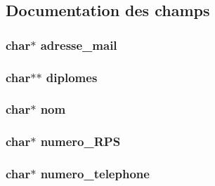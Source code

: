 \subsection{Documentation des champs}
\hypertarget{struct_medecin_aefa944e4b78fb9e14c4f6e49605bba2c}{
\subsubsection[{adresse\-\_\-mail}]{\setlength{\rightskip}{0pt plus 5cm}char$\ast$ adresse\-\_\-mail}}\label{struct_medecin_aefa944e4b78fb9e14c4f6e49605bba2c}
\hypertarget{struct_medecin_a30acb0c2b918d1f2a3bac4b758474832}{
\subsubsection[{diplomes}]{\setlength{\rightskip}{0pt plus 5cm}char$\ast$$\ast$ diplomes}}\label{struct_medecin_a30acb0c2b918d1f2a3bac4b758474832}
\hypertarget{struct_medecin_abe308d273ff51ad86ff02ef3ba3b6f0e}{
\subsubsection[{nom}]{\setlength{\rightskip}{0pt plus 5cm}char$\ast$ nom}}\label{struct_medecin_abe308d273ff51ad86ff02ef3ba3b6f0e}
\hypertarget{struct_medecin_aef3cdf238a67d175fecba3f7df4e6828}{
\subsubsection[{numero\-\_\-\-R\-P\-S}]{\setlength{\rightskip}{0pt plus 5cm}char$\ast$ numero\-\_\-\-R\-P\-S}}\label{struct_medecin_aef3cdf238a67d175fecba3f7df4e6828}
\hypertarget{struct_medecin_ac65f93b2b15c34c800c05832e346c98f}{
\subsubsection[{numero\-\_\-telephone}]{\setlength{\rightskip}{0pt plus 5cm}char$\ast$ numero\-\_\-telephone}}\label{struct_medecin_ac65f93b2b15c34c800c05832e346c98f}
